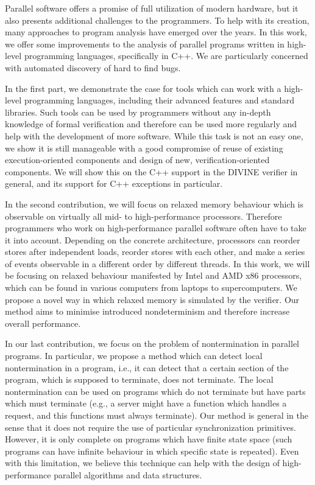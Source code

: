 Parallel software offers a promise of full utilization of modern hardware,
but it also presents additional challenges to the programmers.
To help with its creation, many approaches to program analysis have emerged
over the years.
In this work, we offer some improvements to the analysis of parallel programs
written in high-level programming languages, specifically in C++.
We are particularly concerned with automated discovery of hard to find bugs.

In the first part, we demonstrate the case for tools which can work with a
high-level programming languages, including their advanced features and
standard libraries.
Such tools can be used by programmers without any in-depth knowledge of formal
verification and therefore can be used more regularly and help with the
development of more software.
While this task is not an easy one, we show it is still manageable with a good
compromise of reuse of existing execution-oriented components and design of
new, verification-oriented components.
We will show this on the C++ support in the DIVINE verifier in general, and its
support for C++ exceptions in particular.

In the second contribution, we will focus on relaxed memory behaviour which is
observable on virtually all mid- to high-performance processors.
Therefore programmers who work on high-performance parallel software often have
to take it into account.
Depending on the concrete architecture, processors can reorder stores after
independent loads, reorder stores with each other, and make a series of events
observable in a different order by different threads.
In this work, we will be focusing on relaxed behaviour manifested by Intel and
AMD x86 processors, which can be found in various computers from laptops to
supercomputers.
We propose a novel way in which relaxed memory is simulated by the verifier.
Our method aims to minimise introduced nondeterminism and therefore increase
overall performance.

In our last contribution, we focus on the problem of nontermination in parallel
programs.
In particular, we propose a method which can detect local nontermination in a
program, i.e., it can detect that a certain section of the program, which is
supposed to terminate, does not terminate.
The local nontermination can be used on programs which do not terminate but
have parts which must terminate (e.g., a server might have a function which
handles a request, and this functions must always terminate).
Our method is general in the sense that it does not require the use of
particular synchronization primitives.
However, it is only complete on programs which have finite state space (such
programs can have infinite behaviour in which specific state is repeated).
Even with this limitation, we believe this technique can help with the design
of high-performance parallel algorithms and data structures.


